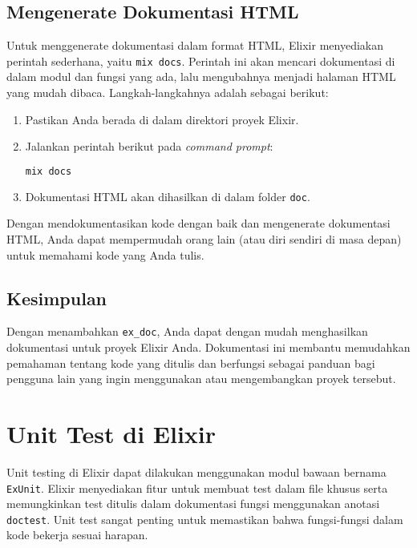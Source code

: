 \subsection{Mengenerate Dokumentasi HTML}

Untuk menggenerate dokumentasi dalam format HTML, Elixir menyediakan perintah sederhana, yaitu \texttt{mix docs}. Perintah ini akan mencari dokumentasi di dalam modul dan fungsi yang ada, lalu mengubahnya menjadi halaman HTML yang mudah dibaca. Langkah-langkahnya adalah sebagai berikut:

\begin{enumerate}
	\item Pastikan Anda berada di dalam direktori proyek Elixir.
	\item Jalankan perintah berikut pada \textit{command prompt}:
	\begin{lstlisting}[language=Bash]
mix docs
	\end{lstlisting}
	
	\item Dokumentasi HTML akan dihasilkan di dalam folder \texttt{doc}.
\end{enumerate}

Dengan mendokumentasikan kode dengan baik dan mengenerate dokumentasi HTML, Anda dapat mempermudah orang lain (atau diri sendiri di masa depan) untuk memahami kode yang Anda tulis.

\subsection{Kesimpulan}

Dengan menambahkan \texttt{ex\_doc}, Anda dapat dengan mudah menghasilkan dokumentasi untuk proyek Elixir Anda. Dokumentasi ini membantu memudahkan pemahaman tentang kode yang ditulis dan berfungsi sebagai panduan bagi pengguna lain yang ingin menggunakan atau mengembangkan proyek tersebut.


\section{Unit Test di Elixir}

Unit testing di Elixir dapat dilakukan menggunakan modul bawaan bernama \texttt{ExUnit}. Elixir menyediakan fitur untuk membuat test dalam file khusus serta memungkinkan test ditulis dalam dokumentasi fungsi menggunakan anotasi \texttt{doctest}. Unit test sangat penting untuk memastikan bahwa fungsi-fungsi dalam kode bekerja sesuai harapan.


